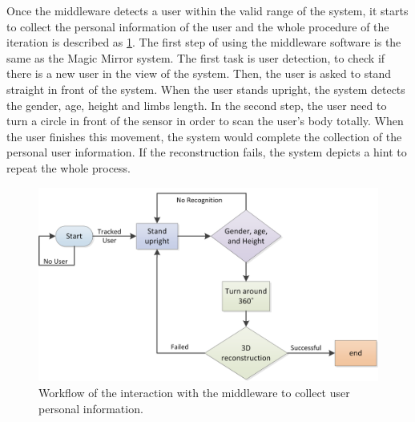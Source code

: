 Once the middleware detects a user within the valid range of the system, it starts to collect the personal information of the user and the whole procedure of the iteration is described as \figurename{\ref{fig:3-PRMM:InteractionWithMiddleware}}.
The first step of using the middleware software is the same as the Magic Mirror system. The first task is user detection, to check if there is a new user in the view of the system. Then, the user is asked to stand straight in front of the system. When the user stands upright, the system detects the gender, age, height and limbs length. 
In the second step, the user need to turn a circle in front of the sensor in order to scan the user's body totally. When the user finishes this movement, the system would complete the collection of the personal user information. If the reconstruction fails, the system depicts a hint to repeat the whole process.
\begin{figure}
	\centering
	\includegraphics[width=0.75\linewidth]{figures/3-PRMM/InteractionWithMiddleware.png}
	\caption{Workflow of the interaction with the middleware to collect user personal information.}
	\label{fig:3-PRMM:InteractionWithMiddleware}
\end{figure}

